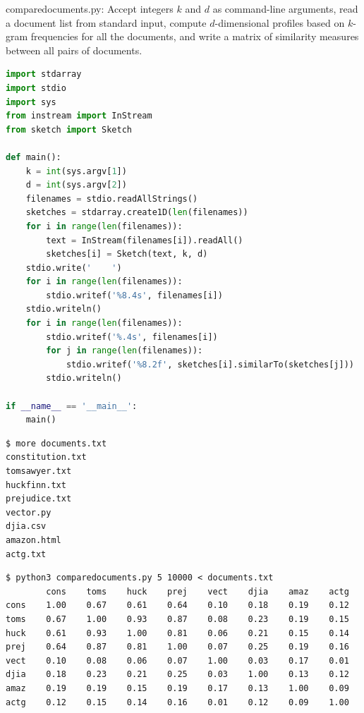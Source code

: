 \documentclass[8pt,a4paper,compress]{beamer}
\begin{document}
\begin{frame}[fragile]
\pause

\begin{framed}
\tiny comparedocuments.py: Accept integers $k$ and $d$ as command-line arguments, read a document list from standard input, compute $d$-dimensional profiles based on $k$-gram frequencies for all the documents, and write a matrix of similarity measures between all pairs of documents.
\end{framed}

\begin{lstlisting}[language=Python,style=focusin]
import stdarray
import stdio
import sys
from instream import InStream
from sketch import Sketch

def main():
    k = int(sys.argv[1])
    d = int(sys.argv[2])
    filenames = stdio.readAllStrings()
    sketches = stdarray.create1D(len(filenames))
    for i in range(len(filenames)):
        text = InStream(filenames[i]).readAll()
        sketches[i] = Sketch(text, k, d)
    stdio.write('    ')
    for i in range(len(filenames)):
        stdio.writef('%8.4s', filenames[i])
    stdio.writeln()
    for i in range(len(filenames)):
        stdio.writef('%.4s', filenames[i])
        for j in range(len(filenames)):
            stdio.writef('%8.2f', sketches[i].similarTo(sketches[j]))
        stdio.writeln()
    
if __name__ == '__main__':
    main()
\end{lstlisting}
\end{frame}

\begin{frame}[fragile]
\pause

\begin{lstlisting}[language={},style=focusin]
$ more documents.txt
constitution.txt
tomsawyer.txt
huckfinn.txt
prejudice.txt
vector.py
djia.csv
amazon.html
actg.txt
\end{lstlisting}

\pause
\bigskip

\begin{lstlisting}[language={},style=focusin]
$ python3 comparedocuments.py 5 10000 < documents.txt
        cons    toms    huck    prej    vect    djia    amaz    actg
cons    1.00    0.67    0.61    0.64    0.10    0.18    0.19    0.12
toms    0.67    1.00    0.93    0.87    0.08    0.23    0.19    0.15
huck    0.61    0.93    1.00    0.81    0.06    0.21    0.15    0.14
prej    0.64    0.87    0.81    1.00    0.07    0.25    0.19    0.16
vect    0.10    0.08    0.06    0.07    1.00    0.03    0.17    0.01
djia    0.18    0.23    0.21    0.25    0.03    1.00    0.13    0.12
amaz    0.19    0.19    0.15    0.19    0.17    0.13    1.00    0.09
actg    0.12    0.15    0.14    0.16    0.01    0.12    0.09    1.00
\end{lstlisting}
\end{frame}
\end{document}
